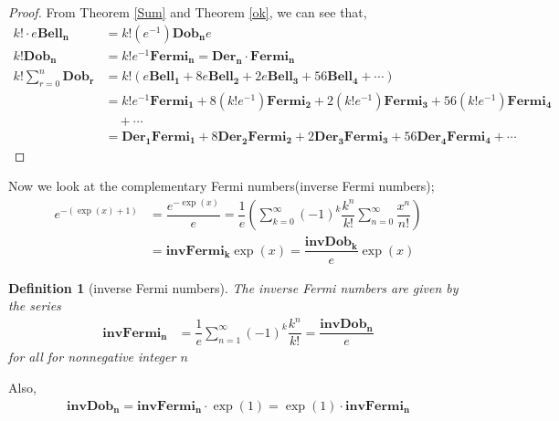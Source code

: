 \documentclass[pdflatex,sn-mathphys-num]{sn-jnl}%
\newtheorem{definition}{Definition}
\theoremstyle{thmstyleone}%
\theoremstyle{thmstyletwo}%
\theoremstyle{thmstylethree}%
\begin{document}
\begin{proof}
From Theorem \ref{Sum} and Theorem \ref{ok}, we can see that,
\begin{align*}
k! \cdotp e\mathbf{Bell_n}&= k!(e^{-1})\mathbf{Dob_n}e\\
k! \mathbf{Dob_n}&= k! e^{-1}\mathbf{Fermi_n} = \mathbf{Der_n}\cdotp \mathbf{Fermi_n}\\
 k!\sum_{r=0}^n \mathbf{Dob_r} &=k!\left(e\mathbf{Bell_1}+ 8 e\mathbf{Bell_2}  + 2 e\mathbf{Bell_3} + 56\mathbf{Bell_4}+\cdots\right)\\
&= k!e^{-1}\mathbf{Fermi_1} + 8(k!e^{-1})\mathbf{Fermi_2} + 2(k!e^{-1})\mathbf{Fermi_3} + 56(k!e^{-1})\mathbf{Fermi_4}\\
& \quad +\cdots \\ 
&= \mathbf{Der_1} \mathbf{Fermi_1} + 8\mathbf{Der_2} \mathbf{Fermi_2} + 2 \mathbf{Der_3} \mathbf{Fermi_3} +56 \mathbf{Der_4} \mathbf{Fermi_4}+  \cdots
    \end{align*}
\end{proof}
\bigskip



Now we look at the complementary Fermi numbers(inverse Fermi numbers);
\begin{align}
     e^{-(\exp{(x)}+1)}&= \dfrac{e^{-\exp{(x)}}}{e}=\dfrac{1}{e}  \left(\sum_{k=0}^{\infty}(-1)^k \dfrac{k^n}{k!}\sum_{n=0}^{\infty}\dfrac{x^n}{n!} \right)\\ \nonumber
     &=\mathbf{invFermi_k}\exp(x)= \dfrac{\mathbf{invDob_k}}{e}\exp{(x)}
\end{align}

\begin{definition}[inverse Fermi numbers]
The inverse Fermi numbers are given by the series
\begin{align*}
     \mathbf{invFermi_{n}}&=\dfrac{1}{e}\sum_{n=1}^{\infty}(-1)^k \dfrac{k^n}{k!}= \dfrac{\mathbf{invDob_n }}{e}
\end{align*}
    for all for nonnegative integer $n$
\end{definition}
Also, 
\begin{align}
   \mathbf{invDob_n }=\mathbf{invFermi_{n}}\cdotp\exp(1)=\exp(1) \cdotp \mathbf{invFermi_{n}}
\end{align}
\end{document}
